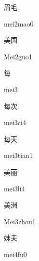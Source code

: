 \begin{multicols*}{2}
\begin{verbete}{眉毛}
\begin{pronuncia}{mei2mao0}
\end{pronuncia}
\end{verbete}

\begin{verbete}{美国}
\begin{pronuncia}{Mei2guo1}
\end{pronuncia}
\end{verbete}

\begin{verbete}[mei3]{每}
\begin{pronuncia}{mei3}
\end{pronuncia}
\end{verbete}

\begin{verbete}[mei3ci4]{每次}
\begin{pronuncia}{mei3ci4}
\end{pronuncia}
\end{verbete}

\begin{verbete}{每天}
\begin{pronuncia}{mei3tian1}
\end{pronuncia}
\end{verbete}

\begin{verbete}[mei3li4]{美丽}
\begin{pronuncia}{mei3li4}
\end{pronuncia}
\end{verbete}

\begin{verbete}{美洲}
\begin{pronuncia}{Mei3zhou1}
\end{pronuncia}
\end{verbete}

\begin{verbete}[mei4fu0]{妹夫}
\begin{pronuncia}{mei4fu0}
\end{pronuncia}
\end{verbete}


\end{multicols*}
